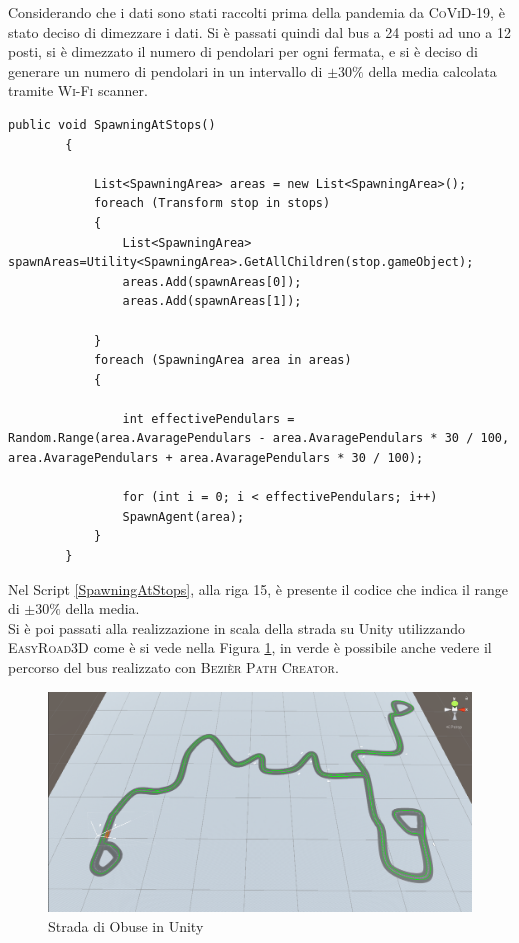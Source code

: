 \documentclass[12pt, openany]{book}
\begin{document}
 	Considerando che i dati sono stati raccolti prima della pandemia da \textsc{CoViD-19}, è stato deciso di dimezzare i dati. Si è passati quindi dal bus a 24 posti ad uno a 12 posti, si è dimezzato il numero di pendolari per ogni fermata, e si è deciso di generare un numero di pendolari in un intervallo di $\pm30\%$ della media calcolata tramite \textsc{Wi-Fi} scanner.
 	\begin{lstlisting}[language={[Sharp]C}, 
 		caption={Genera i pendolari alle fermate}, label={SpawningAtStops}]
 		   public void SpawningAtStops()
 		{
 			
 			List<SpawningArea> areas = new List<SpawningArea>();
 			foreach (Transform stop in stops)
 			{
 				List<SpawningArea> spawnAreas=Utility<SpawningArea>.GetAllChildren(stop.gameObject);
 				areas.Add(spawnAreas[0]);
 				areas.Add(spawnAreas[1]);
 				
 			}
 			foreach (SpawningArea area in areas)
 			{
 				
 				int effectivePendulars = Random.Range(area.AvaragePendulars - area.AvaragePendulars * 30 / 100, area.AvaragePendulars + area.AvaragePendulars * 30 / 100);
 				
 				for (int i = 0; i < effectivePendulars; i++)
 				SpawnAgent(area);
 			}
 		}
 	\end{lstlisting}
 	Nel Script \ref{SpawningAtStops}, alla riga 15, è presente il codice che indica il range di $\pm30\%$ della media.\\
 	Si è poi passati alla realizzazione in scala della strada su Unity utilizzando \textsc{EasyRoad3D} come è si vede nella Figura \ref{fig:ObuseStreet}, in verde è possibile anche vedere il percorso del bus realizzato con \textsc{Bezièr Path Creator}. 
 	\begin{figure}[H]
 		\centering
 		\includegraphics[width=1\linewidth]{"Immagini/ObuseStreet.png"}
 		\caption{Strada di Obuse in Unity}
 		\label{fig:ObuseStreet}
 	\end{figure}
 
\end{document}
